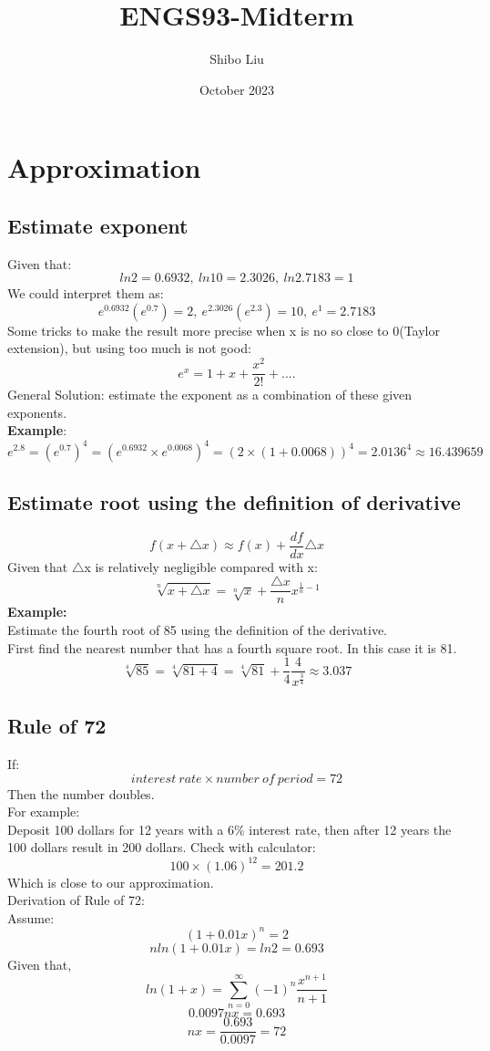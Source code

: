 \documentclass{article}
\title{ENGS93-Midterm}
\author{Shibo Liu}
\date{October 2023}
\begin{document}
\maketitle

\section{Approximation}
\subsection{Estimate exponent}
Given that:
\[ln2=0.6932,\ ln10=2.3026,\ ln2.7183=1\]
We could interpret them as:
\[e^{0.6932}(e^{0.7})=2,\ e^{2.3026}(e^{2.3})=10,\ e^1=2.7183\]
Some tricks to make the result more precise when x is no so close to 0(Taylor extension), but using too much is not good:
\[e^x=1+x+\frac{x^2}{2!}+....\]
General Solution: estimate the exponent as a combination of these given exponents.\\ 
\textbf{Example}:
\[e^{2.8}=(e^{0.7})^4=(e^{0.6932}\times e^{0.0068})^4=(2 \times (1+0.0068))^4=2.0136^4 \approx 16.439659\]

\subsection{Estimate root using the definition of derivative}
\[f(x+ \triangle x) \approx f(x)+\frac{df}{dx}\triangle x\]
Given that $\triangle$x is relatively negligible compared with x:
\[\sqrt[n]{x+\triangle x}=\sqrt[n]{x}+\frac{\triangle x}{n}x^{\frac{1}{n}-1}\]
\textbf{Example:}\\
Estimate the fourth root of 85 using the definition of the derivative.\\
First find the nearest number that has a fourth square root. In this case it is 81.
\[\sqrt[4]{85}=\sqrt[4]{81+4}=\sqrt[4]{81}+\frac{1}{4}\frac{4}{x^{\frac{3}{4}}} \approx 3.037\]
\subsection{Rule of 72}
If:
\[interest\ rate \times number\ of\ period = 72\]
Then the number doubles.\\
For example:\\
Deposit 100 dollars for 12 years with a 6\% interest rate, then after 12 years the 100 dollars result in 200 dollars. Check with calculator:
\[100 \times (1.06)^{12}=201.2\]
Which is close to our approximation.\\
Derivation of Rule of 72:\\
Assume:
\[(1+0.01x)^n=2\]
\[nln(1+0.01x)=ln2=0.693\]
Given that,
\[ln(1+x)=\sum^\infty_{n=0}(-1)^n\frac{x^{n+1}}{n+1}\]
\[0.0097nx = 0.693\]
\[nx=\frac{0.693}{0.0097}=72\]
\end{document}
